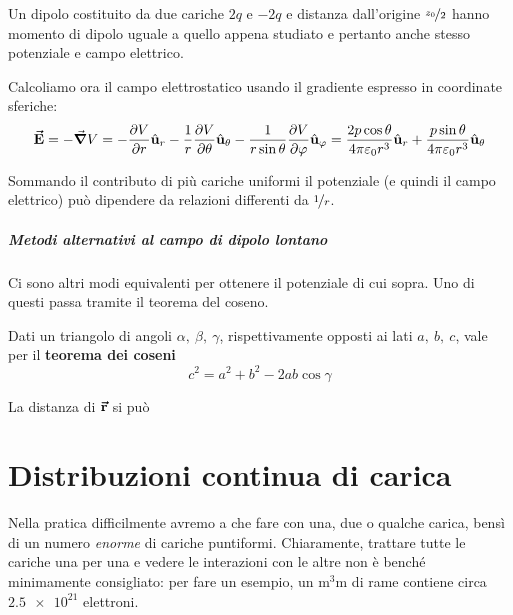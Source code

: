 \begin{example}
	Un dipolo costituito da due cariche $2q$ e $-2q$ e distanza dall'origine $\nicefrac{z_0}{2}$ hanno momento di dipolo uguale a quello appena studiato e pertanto anche stesso potenziale e campo elettrico.
\end{example}
Calcoliamo ora il campo elettrostatico usando il gradiente espresso in coordinate sferiche:
\begin{equation}
	\vb*{\va{E}}=-\grad{V}=-\pdv{V}{r}\hat{\mathbf{u}}_r-\frac{1}{r}\pdv{V}{\theta}\hat{\mathbf{u}}_\theta-\frac{1}{r\sin\theta}\pdv{V}{\varphi}\hat{\mathbf{u}}_\varphi=\frac{2p\cos\theta}{4\pi\varepsilon_0r^3}\hat{\mathbf{u}}_r+\frac{p\sin\theta}{4\pi\varepsilon_0r^3}\hat{\mathbf{u}}_\theta
\end{equation}
\begin{observe}
	Sommando il contributo di più cariche uniformi il potenziale (e quindi il campo elettrico) può dipendere da relazioni differenti da $\nicefrac{1}{r}$.
\end{observe}
\subparagraph{Metodi alternativi al campo di dipolo lontano}
	Ci sono altri modi equivalenti per ottenere il potenziale di cui sopra. Uno di questi passa tramite il teorema del coseno. 
	\begin{remember}
		Dati un triangolo di angoli $\alpha,\ \beta,\ \gamma$, rispettivamente opposti ai lati $a,\ b,\ c$, vale per il \textbf{teorema dei coseni}
		\begin{equation}
			c^2=a^2+b^2-2ab\cos \gamma
		\end{equation}
	\end{remember}
	La distanza di $\vb*{\va{r}}$ si può
\section{Distribuzioni continua di carica}
Nella pratica difficilmente avremo a che fare con una, due o qualche carica, bensì di un numero \textit{enorme} di cariche puntiformi. Chiaramente, trattare tutte le cariche una per una e vedere le interazioni con le altre non è benché minimamente consigliato: per fare un esempio, un $\unit{\cubic\milli\metre}$ di rame contiene circa $\num[exponent-product = \ensuremath{\cdot}]{2,5e21}$ elettroni.

